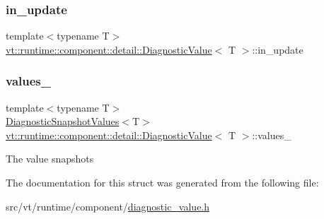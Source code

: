 \mbox{\label{structvt_1_1runtime_1_1component_1_1detail_1_1_diagnostic_value_aec6acfffe46afa1fe3c6b48c6f2713a7}} 
\subsubsection{\texorpdfstring{in\+\_\+update}{in\_update}}
{\footnotesize\ttfamily template$<$typename T$>$ \\
\hyperlink{structvt_1_1runtime_1_1component_1_1detail_1_1_diagnostic_value}{vt\+::runtime\+::component\+::detail\+::\+Diagnostic\+Value}$<$ T $>$\+::in\+\_\+update}

\mbox{\label{structvt_1_1runtime_1_1component_1_1detail_1_1_diagnostic_value_a5f2fd96bc51a48245763ebb2d0c224c7}} 
\subsubsection{\texorpdfstring{values\+\_\+}{values\_}}
{\footnotesize\ttfamily template$<$typename T$>$ \\
\hyperlink{structvt_1_1runtime_1_1component_1_1detail_1_1_diagnostic_snapshot_values}{Diagnostic\+Snapshot\+Values}$<$T$>$ \hyperlink{structvt_1_1runtime_1_1component_1_1detail_1_1_diagnostic_value}{vt\+::runtime\+::component\+::detail\+::\+Diagnostic\+Value}$<$ T $>$\+::values\+\_\+\hspace{0.3cm}{\ttfamily [private]}}

The value snapshots 

The documentation for this struct was generated from the following file\+:\begin{DoxyCompactItemize}
\item 
src/vt/runtime/component/\hyperlink{diagnostic__value_8h}{diagnostic\+\_\+value.\+h}\end{DoxyCompactItemize}
